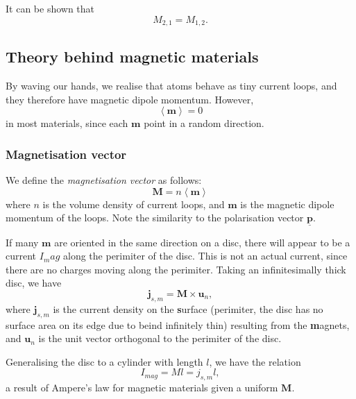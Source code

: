 \documentclass[a4paper, 12pt]{article}
\renewcommand{\vec}[1]{\mathbf{#1}}
\newcommand{\p}{\ensuremath{\vec{\underline{p}}}}
\renewcommand{\j}{\ensuremath{\vec{j}}}
\begin{document}
            It can be shown that 
            \begin{equation}
                M_{2,1} = M_{1,2}.
            \end{equation}
    \subsection{Theory behind magnetic materials}
        By waving our hands, we realise that atoms behave as tiny current loops, and they therefore have magnetic dipole momentum.
        However, 
        \begin{equation*}
            \left<\vec{m}\right> = 0
        \end{equation*}
        in most materials, since each $\vec{m}$ point in a random direction. 
        \subsubsection{Magnetisation vector}
            We define the \textit{magnetisation vector} as follows:
            \begin{equation}
                \vec{M} = n\left<\vec{m}\right>
            \end{equation}
            where $n$ is the volume density of current loops, and $\vec{m}$ is the magnetic dipole momentum of the loops. Note the similarity to the polarisation vector $\p$.

            If many $\vec{m}$ are oriented in the same direction on a disc, there will appear to be a current $I_mag$ along the perimiter of the disc. This is not an actual current, since there are no charges moving along the perimiter.
            Taking an infinitesimally thick disc, we have 
            \begin{equation}
                \j_{s, m} = \vec{M}\times\vec{u}_n,
            \end{equation}
            where $\j_{s, m}$ is the current density on the \textbf{s}urface (perimiter, the disc has no surface area on its edge due to beind infinitely thin) resulting from the \textbf{m}agnets, and $\vec{u}_n$ is the unit vector orthogonal to the perimiter of the disc. 

            Generalising the disc to a cylinder with length $l$, we have the relation
            \begin{equation}
                I_{mag} = Ml = j_{s, m}l,
            \end{equation}
            a result of Ampere's law for magnetic materials given a uniform $\vec{M}$.
\end{document}
